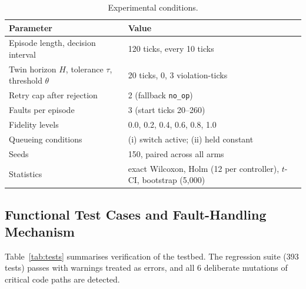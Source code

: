\documentclass[conference]{IEEEtran}
\begin{document}
\begin{table}[t]
\centering
\caption{Experimental conditions.}
\label{tab:conditions}
\footnotesize
\begin{tabular}{@{}p{}p{}@{}}
\toprule
Parameter & Value \\
\midrule
Episode length, decision interval & 120 ticks, every 10 ticks \\
Twin horizon $H$, tolerance $\tau$, threshold $\theta$ & 20 ticks, 0, 3 violation-ticks \\
Retry cap after rejection & 2 (fallback \texttt{no\_op}) \\
Faults per episode & 3 (start ticks 20--260) \\
Fidelity levels & 0.0, 0.2, 0.4, 0.6, 0.8, 1.0 \\
Queueing conditions & (i) switch active; (ii) held constant \\
Seeds & 150, paired across all arms \\
Statistics & exact Wilcoxon, Holm (12 per controller), $t$-CI, bootstrap (5{,}000) \\
\bottomrule
\end{tabular}
\end{table}

\subsection{Functional Test Cases and Fault-Handling Mechanism}

Table~\ref{tab:tests} summarises verification of the testbed. The regression suite (393 tests) passes with warnings treated as errors, and all 6 deliberate mutations of critical code paths are detected.
\end{document}
